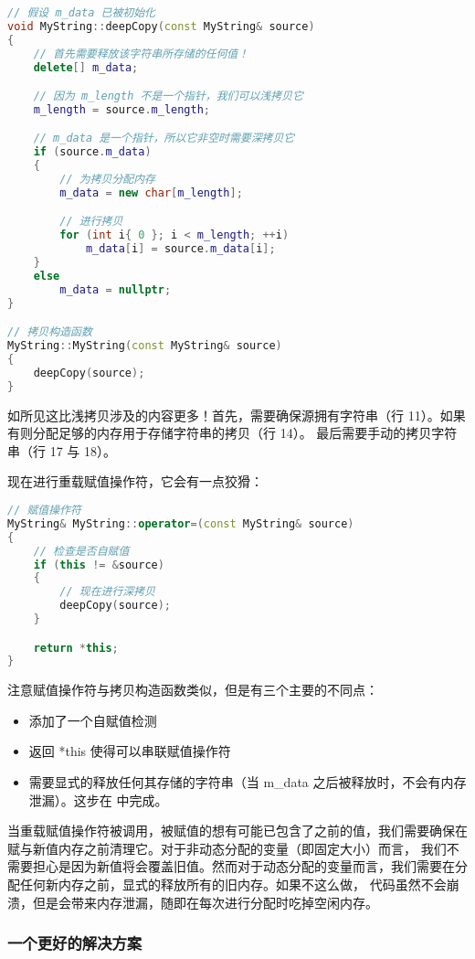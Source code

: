 \documentclass[../../LearnCpp.tex]{subfiles}
\begin{document}
\begin{lstlisting}[language=C++]
// 假设 m_data 已被初始化
void MyString::deepCopy(const MyString& source)
{
    // 首先需要释放该字符串所存储的任何值！
    delete[] m_data;

    // 因为 m_length 不是一个指针，我们可以浅拷贝它
    m_length = source.m_length;

    // m_data 是一个指针，所以它非空时需要深拷贝它
    if (source.m_data)
    {
        // 为拷贝分配内存
        m_data = new char[m_length];

        // 进行拷贝
        for (int i{ 0 }; i < m_length; ++i)
            m_data[i] = source.m_data[i];
    }
    else
        m_data = nullptr;
}

// 拷贝构造函数
MyString::MyString(const MyString& source)
{
    deepCopy(source);
}
\end{lstlisting}

如所见这比浅拷贝涉及的内容更多！首先，需要确保源拥有字符串（行 11）。如果有则分配足够的内存用于存储字符串的拷贝（行 14）。
最后需要手动的拷贝字符串（行 17 与 18）。

现在进行重载赋值操作符，它会有一点狡猾：

\begin{lstlisting}[language=C++]
// 赋值操作符
MyString& MyString::operator=(const MyString& source)
{
    // 检查是否自赋值
    if (this != &source)
    {
        // 现在进行深拷贝
        deepCopy(source);
    }

    return *this;
}
\end{lstlisting}

注意赋值操作符与拷贝构造函数类似，但是有三个主要的不同点：

\begin{itemize}
  \item 添加了一个自赋值检测
  \item 返回 *this 使得可以串联赋值操作符
  \item 需要显式的释放任何其存储的字符串（当 m\_data 之后被释放时，不会有内存泄漏）。这步在  中完成。
\end{itemize}

当重载赋值操作符被调用，被赋值的想有可能已包含了之前的值，我们需要确保在赋与新值内存之前清理它。对于非动态分配的变量（即固定大小）而言，
我们不需要担心是因为新值将会覆盖旧值。然而对于动态分配的变量而言，我们需要在分配任何新内存之前，显式的释放所有的旧内存。如果不这么做，
代码虽然不会崩溃，但是会带来内存泄漏，随即在每次进行分配时吃掉空闲内存。

\subsubsection*{一个更好的解决方案}
\end{document}
